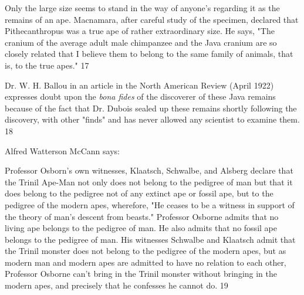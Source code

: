 Only the large size seems to stand in the way of anyone's regarding it as the remains of an
ape. Macnamara, after careful study of the specimen, declared that Pithecanthropus was a
true ape of rather extraordinary size. He says, "The cranium of the average adult male
chimpanzee and the Java cranium are so closely related that I believe them to belong to the
same family of animals, that is, to the true apes." 17

Dr. W. H. Ballou in an article in the North American Review (April 1922) expresses doubt
upon the \textit{bona fides} of the discoverer of these Java remains because of the fact that Dr.
Dubois sealed up these remains shortly following the discovery, with other "finds" and has
never allowed any scientist to examine them. 18

Alfred Watterson McCann says:

Professor Osborn's own witnesses, Klaatsch, Schwalbe, and Alsberg declare that the Trinil
Ape-Man not only does not belong to the pedigree of man but that it does belong to the
pedigree not of any extinct ape or fossil ape, but to the pedigree of the modern apes,
wherefore, "He ceases to be a witness in support of the theory of man's descent from beasts."
Professor Osborne admits that no living ape belongs to the pedigree of man. He also admits
that no fossil ape belongs to the pedigree of man. His witnesses Schwalbe and Klaatsch admit
that the Trinil monster does not belong to the pedigree of the modern apes, but as modern
man and modern apes are admitted to have no relation to each other, Professor Osborne can't
bring in the Trinil monster without bringing in the modern apes, and precisely that he
confesses he cannot do. 19

